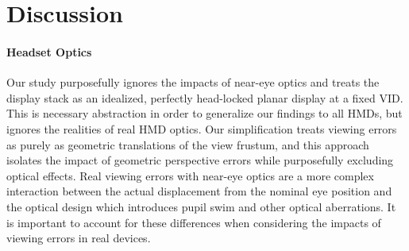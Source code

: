\section{Discussion}
\label{sec:discussion}


\paragraph{Headset Optics}
Our study purposefully ignores the impacts of near-eye optics and treats the display stack as an idealized, perfectly head-locked planar display at a fixed VID. This is necessary abstraction in order to generalize our findings to all HMDs, but ignores the realities of real HMD optics. Our simplification treats viewing errors as purely as geometric translations of the view frustum, and this approach isolates the impact of geometric perspective errors while purposefully excluding optical effects. Real viewing errors with near-eye optics are a more complex interaction between the actual displacement from the nominal eye position and the optical design which introduces pupil swim and other optical aberrations. It is important to account for these differences when considering the impacts of viewing errors in real devices.

